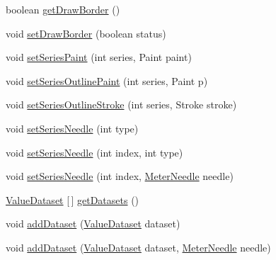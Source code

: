 \begin{DoxyCompactItemize}
boolean \mbox{\hyperlink{classorg_1_1jfree_1_1chart_1_1plot_1_1_compass_plot_a7e539c5097083903be1d9db04a28e5c8}{get\+Draw\+Border}} ()
\item 
void \mbox{\hyperlink{classorg_1_1jfree_1_1chart_1_1plot_1_1_compass_plot_a51c6d6fab150718d76e187dbcee91c78}{set\+Draw\+Border}} (boolean status)
\item 
void \mbox{\hyperlink{classorg_1_1jfree_1_1chart_1_1plot_1_1_compass_plot_a87cfbe98bd7fff9715b80a2e03ca8132}{set\+Series\+Paint}} (int series, Paint paint)
\item 
void \mbox{\hyperlink{classorg_1_1jfree_1_1chart_1_1plot_1_1_compass_plot_a4cc92c294efa38c6f1817ac71d48def9}{set\+Series\+Outline\+Paint}} (int series, Paint p)
\item 
void \mbox{\hyperlink{classorg_1_1jfree_1_1chart_1_1plot_1_1_compass_plot_acf5f6f807b128ab9b24eda71da40f7d3}{set\+Series\+Outline\+Stroke}} (int series, Stroke stroke)
\item 
void \mbox{\hyperlink{classorg_1_1jfree_1_1chart_1_1plot_1_1_compass_plot_a6fae0892abeec874e3c75de69f6d1b13}{set\+Series\+Needle}} (int type)
\item 
void \mbox{\hyperlink{classorg_1_1jfree_1_1chart_1_1plot_1_1_compass_plot_afa5a17dbb86f1f9673b37fa3df8b4403}{set\+Series\+Needle}} (int index, int type)
\item 
void \mbox{\hyperlink{classorg_1_1jfree_1_1chart_1_1plot_1_1_compass_plot_a93db9d9fa849e37a10977de35f196f35}{set\+Series\+Needle}} (int index, \mbox{\hyperlink{classorg_1_1jfree_1_1chart_1_1needle_1_1_meter_needle}{Meter\+Needle}} needle)
\item 
\mbox{\hyperlink{interfaceorg_1_1jfree_1_1data_1_1general_1_1_value_dataset}{Value\+Dataset}} \mbox{[}$\,$\mbox{]} \mbox{\hyperlink{classorg_1_1jfree_1_1chart_1_1plot_1_1_compass_plot_a699c39ee9364f618d9e06e5a5a4c07cb}{get\+Datasets}} ()
\item 
void \mbox{\hyperlink{classorg_1_1jfree_1_1chart_1_1plot_1_1_compass_plot_a3a3398e3cbb7a45f105c374b8f223587}{add\+Dataset}} (\mbox{\hyperlink{interfaceorg_1_1jfree_1_1data_1_1general_1_1_value_dataset}{Value\+Dataset}} dataset)
\item 
void \mbox{\hyperlink{classorg_1_1jfree_1_1chart_1_1plot_1_1_compass_plot_a8250e23d802a152007f4038cbb92689b}{add\+Dataset}} (\mbox{\hyperlink{interfaceorg_1_1jfree_1_1data_1_1general_1_1_value_dataset}{Value\+Dataset}} dataset, \mbox{\hyperlink{classorg_1_1jfree_1_1chart_1_1needle_1_1_meter_needle}{Meter\+Needle}} needle)
\item 

\end{DoxyCompactItemize}
